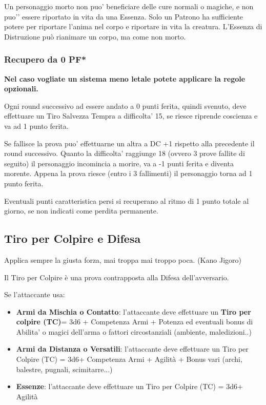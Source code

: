 \documentclass[a4paper,11pt,twoside,openany]{book}
\begin{document}
\bigskip

Un personaggio morto non puo’ beneficiare delle cure normali o magiche, e non puo'’ essere riportato in vita da una Essenza. Solo un Patrono ha sufficiente potere per riportare l’anima nel corpo e riportare in vita la creatura. L’Essenza di Distruzione può rianimare un corpo, ma come non morto.

\subsubsection{Recupero da 0 PF*}  

\textbf{Nel caso vogliate un sistema meno letale potete applicare la regole opzionali.}

Ogni round successivo ad essere andato a 0 punti ferita, quindi svenuto, deve effettuare un Tiro Salvezza Tempra a difficolta’ 15, se riesce riprende coscienza e va ad 1 punto ferita.

Se fallisce la prova puo’ effettuarne un altra a DC +1 rispetto alla precedente il round successivo. Quanto la difficolta’ raggiunge 18 (ovvero 3 prove fallite di seguito) il personaggio incomincia a morire, va a -1 punti ferita e diventa morente.
Appena la prova riesce (entro i 3 fallimenti) il personaggio torna ad 1 punto ferita.

Eventuali punti caratteristica persi si recuperano al ritmo di 1 punto totale al giorno, se non indicati come perdita permanente.

\pagebreak

\subsection{Tiro per Colpire e Difesa}

\label{tiro-per-colpire}
\begin{tcolorbox}[enhanced,arc=5pt,boxrule=0.3pt]{Applica sempre la giusta forza, mai troppa mai troppo poca. (Kano Jigoro)}\end{tcolorbox}\medskip

Il Tiro per Colpire è una prova contrapposta alla Difesa dell'avversario.

Se l'attaccante usa:

\begin{itemize}
	\item \textbf{Armi da Mischia o Contatto}: l'attaccante deve effettuare un \textbf{Tiro per colpire (TC)}= 3d6 + Competenza Armi + Potenza ed eventuali bonus di Abilita' o magici dell'arma o fattori circostanziali (ambiente, maledizioni..)
	
	\item
	\textbf{Armi da Distanza o Versatili}: l'attaccante deve effettuare un Tiro per Colpire (TC) = 3d6+ Competenza Armi + Agilità + Bonus vari (archi, balestre, pugnali, scimitarre...)
	
	\item
	\textbf{Essenze}: l'attaccante deve effettuare un Tiro per Colpire (TC) = 3d6+ Agilità	
\end{itemize}
\end{document}

